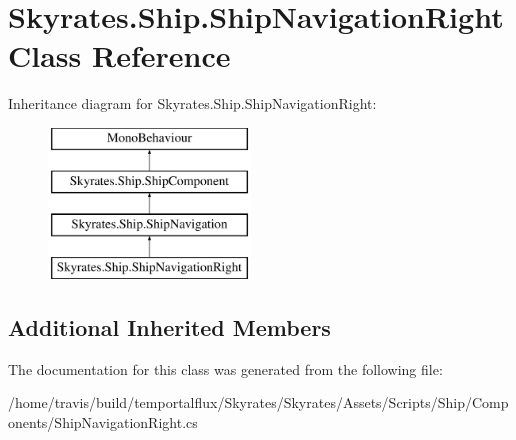 \hypertarget{class_skyrates_1_1_ship_1_1_ship_navigation_right}{\section{Skyrates.\-Ship.\-Ship\-Navigation\-Right Class Reference}
\label{class_skyrates_1_1_ship_1_1_ship_navigation_right}
}
Inheritance diagram for Skyrates.\-Ship.\-Ship\-Navigation\-Right\-:\begin{figure}[H]
\begin{center}
\leavevmode
\includegraphics[height=4.000000cm]{class_skyrates_1_1_ship_1_1_ship_navigation_right}
\end{center}
\end{figure}
\subsection*{Additional Inherited Members}


The documentation for this class was generated from the following file\-:\begin{DoxyCompactItemize}
\item 
/home/travis/build/temportalflux/\-Skyrates/\-Skyrates/\-Assets/\-Scripts/\-Ship/\-Components/Ship\-Navigation\-Right.\-cs\end{DoxyCompactItemize}
